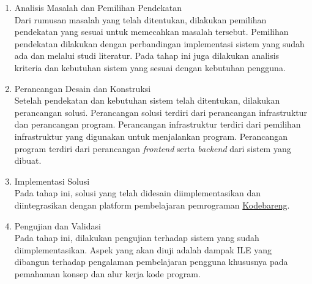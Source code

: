 \begin{enumerate}
      \item Analisis Masalah dan Pemilihan Pendekatan \\
            Dari rumusan masalah yang telah ditentukan, dilakukan pemilihan pendekatan yang sesuai untuk memecahkan masalah tersebut. Pemilihan pendekatan dilakukan dengan perbandingan implementasi sistem yang sudah ada dan melalui studi literatur. Pada tahap ini juga dilakukan analisis kriteria dan kebutuhan sistem yang sesuai dengan kebutuhan pengguna.
      \item Perancangan Desain dan Konstruksi \\
            Setelah pendekatan dan kebutuhan sistem telah ditentukan, dilakukan perancangan solusi. Perancangan solusi terdiri dari perancangan infrastruktur dan perancangan program. Perancangan infrastruktur terdiri dari pemilihan infrastruktur yang digunakan untuk menjalankan program. Perancangan program terdiri dari perancangan \textit{frontend} serta \textit{backend} dari sistem yang dibuat.
      \item Implementasi Solusi \\
            Pada tahap ini, solusi yang telah didesain diimplementasikan dan diintegrasikan dengan platform pembelajaran pemrograman \href{https://kodebareng.id}{Kodebareng}.
      \item Pengujian dan Validasi \\
            Pada tahap ini, dilakukan pengujian terhadap sistem yang sudah diimplementasikan. Aspek yang akan diuji adalah dampak ILE yang dibangun terhadap pengalaman pembelajaran pengguna khususnya pada pemahaman konsep dan alur kerja kode program.
\end{enumerate}



